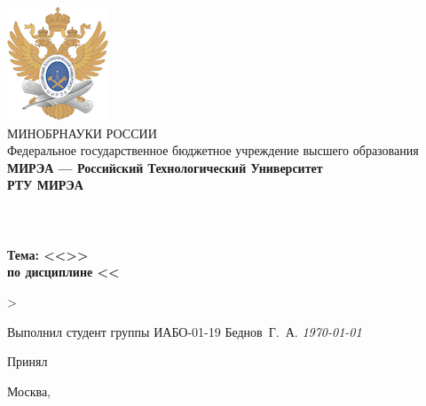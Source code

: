 \renewcommand{\thelstlisting}{\thesection.\arabic{\thelstlistring}} %
\begin{titlepage}
\begin{center}
	\includegraphics[width=0.1\linewidth]{MIREAquila.png}\\
	\small\MakeUppercase{Минобрнауки России}\\
	Федеральное государственное бюджетное учреждение высшего образования\\
	\bf МИРЭА --- Российский Технологический Университет\\
	\normalsize РТУ МИРЭА\\
	\rm \institute\\
	\department\\
	\vfill\bf
	\MakeUppercase{\worktype}\\
	Тема: <<\topic>>\\
	по дисциплине <<\subject>>\\
	\vfill
\end{center}
\par\noindent\rm Выполнил студент группы ИАБО-01-19 Беднов~Г.~А. {\it\today}
\par\noindent Принял \regalia{} \teacher
	\vfill
	\vfill
\begin{center}
	Москва, \the\year{}
\end{center}
\end{titlepage}
\renewcommand{\contentsname}{\hbox to 1.0\textwidth{\hfil\MakeUppercase{СОДЕРЖАНИЕ}\hfil}}
\tableofcontents

